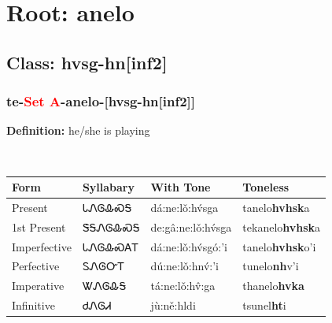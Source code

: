 \needspace{4in}
\section*{Root: anelo}
\nopagebreak
{}
\needspace{3in}
\subsection*{Class: hvsg-hn[inf2]}
\nopagebreak
\needspace{2in}
\subsubsection*{te{-}\textcolor{Red}{Set A}{-}\textbf{anelo}{-}[hvsg-hn[inf2]]}
\nopagebreak
\textbf{Definition: } he/she is playing
\\[0.5em]
\begin{tabularx}{\textwidth}{l X X X}%
\toprule%
\textbf{Form}&\textbf{Syllabary}&\textbf{With Tone}&\textbf{Toneless}\\%
\midrule%
Present&ᏓᏁᎶᎲᏍᎦ&dá:ne:lǒ:hv́sga&tanelo\textbf{hvhsk}a\\%
1st Present&ᏕᎦᏁᎶᎲᏍᎦ&de:gâ:ne:lǒ:hv́sga&tekanelo\textbf{hvhsk}a\\%
Imperfective&ᏓᏁᎶᎲᏍᎪᎢ&dá:ne:lǒ:hv́sgó:’i&tanelo\textbf{hvhsk}o'i\\%
Perfective&ᏚᏁᎶᏅᎢ&dú:ne:lǒ:hnv́:’i&tunelo\textbf{nh}v'i\\%
Imperative&ᏔᏁᎶᎲᎦ&tá:ne:lǒ:hv̂:ga&thanelo\textbf{hvka}\\%
Infinitive&ᏧᏁᎶᏗ&jù:ně:hldi&tsunel\textbf{ht}i\\%
\bottomrule%
\end{tabularx}
\\[1em]